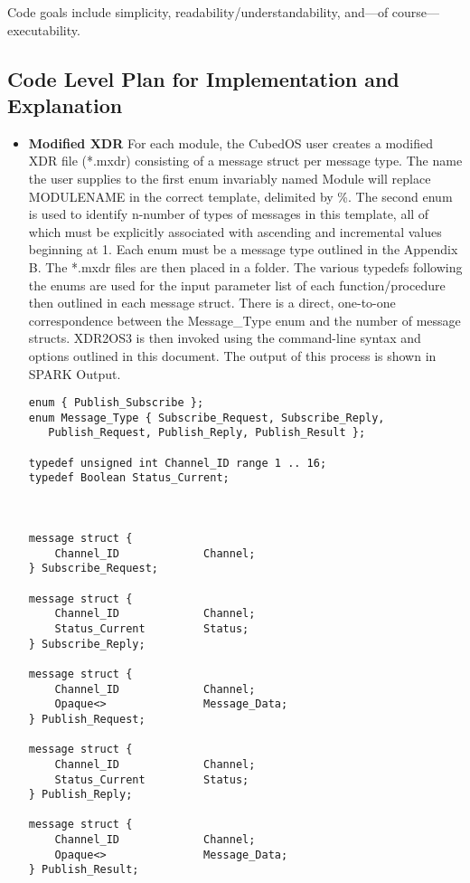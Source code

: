 Code goals include simplicity, readability/understandability, and—of course—executability.

\subsection{Code Level Plan for Implementation and Explanation}

\begin{itemize}
\item \textbf{Modified XDR} For each module, the CubedOS user creates a modified XDR file
  (*.mxdr) consisting of a message struct per message type. The name the user supplies to the
  first enum invariably named Module will replace MODULENAME in the correct template, delimited
  by \%. The second enum is used to identify n-number of types of messages in this template, all
  of which must be explicitly associated with ascending and incremental values beginning at 1.
  Each enum must be a message type outlined in the Appendix B. The *.mxdr files are then placed
  in a folder. The various typedefs following the enums are used for the input parameter list of
  each function/procedure then outlined in each message struct. There is a direct, one-to-one
  correspondence between the Message\_Type enum and the number of message structs. XDR2OS3 is
  then invoked using the command-line syntax and options outlined in this document. The output
  of this process is shown in SPARK Output.
\begin{verbatim}
enum { Publish_Subscribe };
enum Message_Type { Subscribe_Request, Subscribe_Reply, 
   Publish_Request, Publish_Reply, Publish_Result };

typedef unsigned int Channel_ID range 1 .. 16;
typedef Boolean Status_Current;



message struct {
    Channel_ID             Channel;
} Subscribe_Request;

message struct {
    Channel_ID             Channel;
    Status_Current         Status;
} Subscribe_Reply;

message struct {
    Channel_ID             Channel;
    Opaque<>               Message_Data;
} Publish_Request;

message struct {
    Channel_ID             Channel;
    Status_Current         Status;
} Publish_Reply;

message struct {
    Channel_ID             Channel;
    Opaque<>               Message_Data;
} Publish_Result;
\end{verbatim}
  

\end{itemize}
